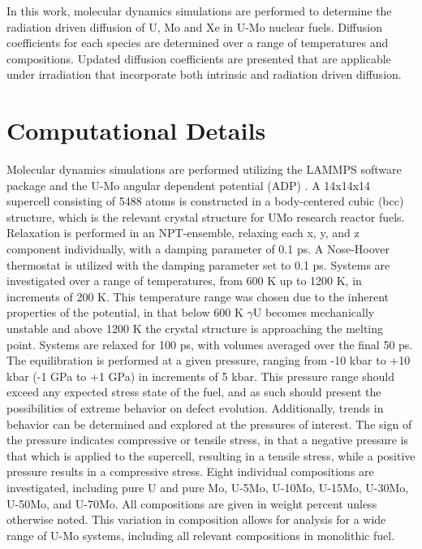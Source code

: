 \documentclass[default]{sn-jnl}%
\begin{document}
In this work, molecular dynamics simulations are performed to determine the radiation driven diffusion of U, Mo and Xe in U-Mo nuclear fuels. Diffusion coefficients for each species are determined over a range of temperatures and compositions. Updated diffusion coefficients are presented that are applicable under irradiation that incorporate both intrinsic and radiation driven diffusion. 

\section{Computational Details}\label{sec2}

Molecular dynamics simulations are performed utilizing the LAMMPS \cite{plimpton1995} software package and the U-Mo angular dependent potential (ADP) \cite{smirnovaADP}. A 14x14x14 supercell consisting of 5488 atoms is constructed in a body-centered cubic (bcc) structure, which is the relevant crystal structure for UMo research reactor fuels. Relaxation is performed in an NPT-ensemble, relaxing each x, y, and z component individually, with a damping parameter of 0.1 ps. A Nose-Hoover thermostat is utilized with the damping parameter set to 0.1 ps. Systems are investigated over a range of temperatures, from 600 K up to 1200 K, in increments of 200 K. This temperature range was chosen due to the inherent properties of the potential, in that below 600 K $\gamma$U becomes mechanically unstable and above 1200 K the crystal structure is approaching the melting point. Systems are relaxed for 100 ps, with volumes averaged over the final 50 ps. The equilibration is performed at a given pressure, ranging from -10 kbar to +10 kbar (-1 GPa to +1 GPa) in increments of 5 kbar. This pressure range should exceed any expected stress state of the fuel, and as such should present the possibilities of extreme behavior on defect evolution. Additionally, trends in behavior can be determined and explored at the pressures of interest. The sign of the pressure indicates compressive or tensile stress, in that a negative pressure is that which is applied to the supercell, resulting in a tensile stress, while a positive pressure results in a compressive stress. Eight individual compositions are investigated, including pure U and pure Mo, U-5Mo, U-10Mo, U-15Mo, U-30Mo, U-50Mo, and U-70Mo. All compositions are given in weight percent unless otherwise noted. This variation in composition allows for analysis for a wide range of U-Mo systems, including all relevant compositions in monolithic fuel.  
\end{document}

